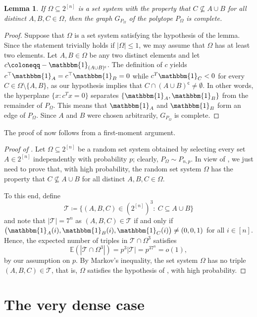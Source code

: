 \documentclass[11pt,a4paper,oneside,reqno]{amsart}
\newtheorem{lemma}[theorem]{Lemma}
\newcommand{\EE}{\mathbb{E}}
\newcommand{\cT}{\mathcal{T}}
\def\1{\mathbbm{1}}
\begin{document}
\begin{lemma}\label{clm:complete}
  If $\Omega \subseteq 2^{[n]}$ is a set system with the property that $C \nsubseteq A\cup B$ for all distinct $A,B,C \in \Omega$, then the graph $G_{P_\Omega}$ of the polytope $P_{\Omega}$ is complete. 
\end{lemma}

\begin{proof}
  Suppose that $\Omega$ is a set system satisfying the hypothesis of the lemma.
  Since the statement trivially holds if $|\Omega| \le 1$, we may assume that $\Omega$ has at least two elements.
  Let $A,B \in \Omega$ be any two distinct elements and let $c \coloneqq -\1_{(A \cup B)^{\mathsf{c}}}$.
  The definition of $c$ yields $c^\top \1_A = c^\top\1_B = 0$ while $c^T \1_C < 0$ for every $C \in \Omega \setminus \{A,B\}$, as our hypothesis implies that $C \cap (A \cup B)^{\mathsf{c}} \neq \emptyset$.
  In other words, the hyperplane $\{x : c^Tx = 0\}$ separates $\{\1_A, \1_B\}$ from the remainder of $P_\Omega$.
  This means that $\1_A$ and $\1_B$ form an edge of $P_\Omega$.
  Since $A$ and $B$ were chosen arbitrarily, $G_{P_\Omega}$ is complete.
\end{proof}

The proof of  now follows from a first-moment argument.

\begin{proof}[Proof of ]
  Let $\Omega \subseteq 2^{[n]}$ be a random set system obtained by selecting every set $A \in 2^{[n]}$ independently with probability $p$; clearly, $P_\Omega \sim P_{n,p}$.
  In view of , we just need to prove that, with high probability, the random set system $\Omega$ has the property that $C \nsubseteq A\cup B$ for all distinct $A, B, C \in \Omega$. 

  To this end, define
  \[
    \cT \coloneqq \{(A,B,C) \in (2^{[n]})^3:\: C \subseteq A\cup B\}
  \]
  and note that $|\cT| = 7^n$ as $(A, B, C) \in \cT$ if and only if $\bigl(\1_A(i), \1_B(i), \1_C(i)\bigr) \neq (0,0,1)$ for all $i \in [n]$.
  Hence, the expected number of triples in $\cT\cap \Omega^3$ satisfies
  \[
    \EE\left(|\cT\cap \Omega^3|\right)=p^3|\cT|=p^37^n=o(1),
  \]
  by our assumption on $p$.
  By Markov's inequality, the set system $\Omega$ has no triple $(A,B,C) \in \cT$, that is, $\Omega$ satisfies the hypothesis of , with high probability.
\end{proof}

\section{The very dense case}\label{sec:verydense}
\end{document}
